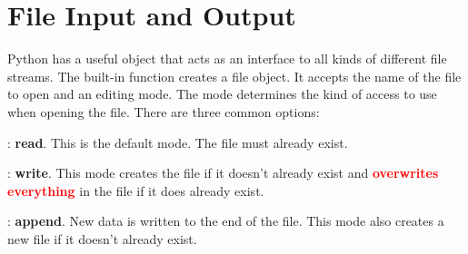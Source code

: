 \begin{comment}
\begin{warn} %
An \li{except} statement by itself catches \emph{any} exception raised in the corresponding try block, but this approach can mistakenly mask unexpected errors.
Consider the following function, which intends to avoid dividing by zero.

\begin{lstlisting}
>>> def divider(x, y):
...     try:
...         return x / float(yy)
...     except:
...         print("y must not equal zero!")
...
>>> divider(2, 3)
<<y must not equal zero!>>
\end{lstlisting}

Because \li{y} is misspelled as \li{yy}, a \li{NameError} is always raised in the try block.
Always specify the kinds of exceptions you expect to encounter.

\begin{lstlisting}
>>> def divider(x, y):
...     try:
...         return x / float(yy)
...     except ZeroDivisionError:
...         print("y must not equal zero!")
...
>>> divider(2, 3)
<<Traceback (most recent call last):
  File "<stdin>", line 1, in <module>
  File "<stdin>", line 3, in divider
NameError: global name 'yy' is not defined>>    # Now we can see the mistake.
\end{lstlisting}
\end{warn}
\end{comment}

\section*{File Input and Output} %

Python has a useful  object that acts as an interface to all kinds of different file streams.
The built-in function  creates a file object.
It accepts the name of the file to open and an editing mode.
The mode determines the kind of access to use when opening the file.
There are three common options:
%
\begin{description}
\item {}: \textbf{read}.
This is the default mode.
The file must already exist.
\item {}: \textbf{write}.
This mode creates the file if it doesn't already exist and \textcolor{red}{\textbf{overwrites everything}} in the file if it does already exist. %
\item {}: \textbf{append}.
New data is written to the end of the file.
This mode also creates a new file if it doesn't already exist.
\end{description}

